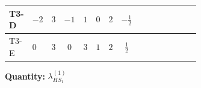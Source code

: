 \documentclass[8pt]{article}
\begin{document}
\begin{landscape}
\begin{longtable}{@{}llcccccc >{\raggedright\arraybackslash}p{0.21\linewidth} >{\raggedright\arraybackslash}p{0.21\linewidth} >{\raggedright\arraybackslash}p{0.21\linewidth}@{}}
T3-D & $-2$ & $3$ & $-1$ & $1$ & $0$ & $2$ & $-\frac{1}{2}$ & \scriptsize\adjustbox{max width=\linewidth}{$\begin{gathered} -\frac{33 {g_2}^2 {\lambda_{HS_1}^{(1)}}}{2}\end{gathered}$} & \scriptsize\adjustbox{max width=\linewidth}{$\begin{gathered} -\frac{15 {g_1}^2 {\lambda_{HS_1}^{(1)}}}{2}\end{gathered}$} & \scriptsize\adjustbox{max width=\linewidth}{$\begin{gathered} {\lambda_{HS_1}^{(1)}} (2 T_{\nu}^{(1)}+6 \operatorname{Tr}\!\left({Y_d}\,\left({Y_d}\right)^{\dagger}\right)+2 \operatorname{Tr}\!\left({Y_e}\,\left({Y_e}\right)^{\dagger}\right)+6 \operatorname{Tr}\!\left({Y_u}\,\left({Y_u}\right)^{\dagger}\right)+4 {\lambda_{S_1}^{(A)}})\end{gathered}$} \\
\midrule
T3-E & $0$ & $3$ & $0$ & $3$ & $1$ & $2$ & $\frac{1}{2}$ & \scriptsize\adjustbox{max width=\linewidth}{$\begin{gathered} -\frac{33 {g_2}^2 {\lambda_{HS_1}^{(1)}}}{2}\end{gathered}$} & \scriptsize\adjustbox{max width=\linewidth}{$\begin{gathered} -\frac{3 {g_1}^2 {\lambda_{HS_1}^{(1)}}}{2}\end{gathered}$} & \scriptsize\adjustbox{max width=\linewidth}{$\begin{gathered} {\lambda_{HS_1}^{(1)}} (2 T_{\nu}^{(1)}+6 \operatorname{Tr}\!\left({Y_d}\,\left({Y_d}\right)^{\dagger}\right)+2 \operatorname{Tr}\!\left({Y_e}\,\left({Y_e}\right)^{\dagger}\right)+6 \operatorname{Tr}\!\left({Y_u}\,\left({Y_u}\right)^{\dagger}\right)+4 {\lambda_{S_1}^{(A)}})\end{gathered}$} \\
\midrule
\bottomrule
\end{longtable}
\clearpage
\noindent\textbf{Quantity: }$\lambda_{HS_1}^{(1)}$\par\smallskip

\end{landscape}
\end{document}
